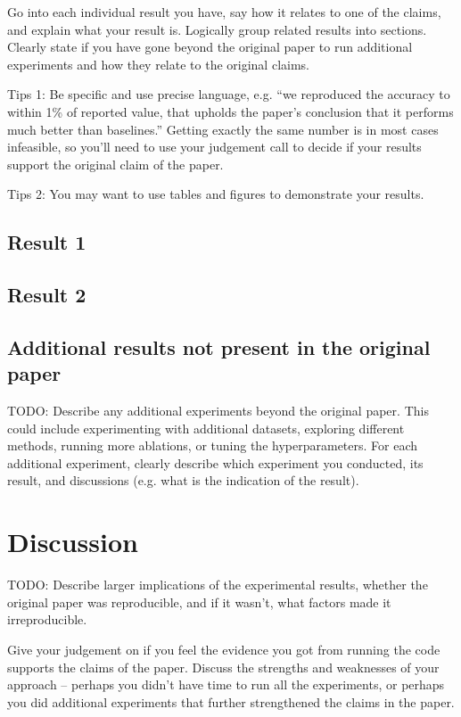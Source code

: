\documentclass[11pt,a4paper]{article}
\begin{document}
Go into each individual result you have, say how it relates to one of the claims, and explain what your result is. Logically group related results into sections. Clearly state if you have gone beyond the original paper to run additional experiments and how they relate to the original claims. 

Tips 1: Be specific and use precise language, e.g. ``we reproduced the accuracy to within 1\% of reported value, that upholds the paper's conclusion that it performs much better than baselines.'' Getting exactly the same number is in most cases infeasible, so you'll need to use your judgement call to decide if your results support the original claim of the paper. 

Tips 2: You may want to use tables and figures to demonstrate your results.


\subsection{Result 1}

\subsection{Result 2}

\subsection{Additional results not present in the original paper}
TODO: 
Describe any additional experiments beyond the original paper. This could include experimenting with additional datasets, exploring different methods, running more ablations, or tuning the hyperparameters. For each additional experiment, clearly describe which experiment you conducted, its result, and discussions (e.g. what is the indication of the result).

\section{Discussion}
TODO: 
Describe larger implications of the experimental results, whether the original paper was reproducible, and if it wasn’t, what factors made it irreproducible. 

Give your judgement on if you feel the evidence you got from running the code supports the claims of the paper. Discuss the strengths and weaknesses of your approach -- perhaps you didn't have time to run all the experiments, or perhaps you did additional experiments that further strengthened the claims in the paper.
\end{document}
